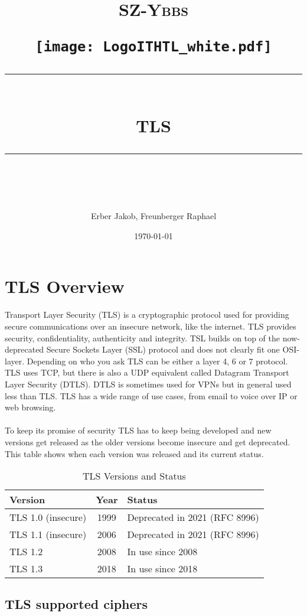 \documentclass[11pt]{scrartcl} %
\title{	
	\normalfont\normalsize
	\begin{center}
		\begin{minipage}[c]{0.2\textwidth}
			\textsc{\Large SZ-Ybbs}
		\end{minipage}%
		\begin{minipage}[c]{0.1\textwidth}
			\texttt{[image: LogoITHTL\_white.pdf]}
		\end{minipage}
	\end{center}
	\vspace{10pt} %
	\rule{\linewidth}{0.5pt}\\ %
	\vspace{20pt} %
	{\huge TLS}\\ %
	\vspace{12pt} %
	\rule{\linewidth}{2pt}\\ %
	\vspace{12pt} %
}
\author{\LARGE Erber Jakob, Freunberger Raphael} %
\date{\normalsize\today} %
\begin{document}
\maketitle %

\section{TLS Overview}

Transport Layer Security (TLS) is a cryptographic protocol used for providing secure communications over an insecure network, like the internet. TLS provides security, confidentiality, authenticity and integrity. TSL builds on top of the now-deprecated Secure Sockets Layer (SSL) protocol and does not clearly fit one OSI-layer. Depending on who you ask TLS can be either a layer 4, 6 or 7 protocol. TLS uses TCP, but there is also a UDP equivalent called Datagram Transport Layer Security (DTLS). DTLS is sometimes used for VPNs but in general used less than TLS. TLS has a wide range of use cases, from email to voice over IP or web browsing.
\\\\
To keep its promise of security TLS has to keep being developed and new versions get released as the older versions become insecure and get deprecated. This table shows when each version was released and its current status.

\begin{table}[h]
    \centering
    \begin{tabular}{|l|c|l|}
        \hline
        \textbf{Version} & \textbf{Year} & \textbf{Status} \\ \hline
        TLS 1.0 (insecure) & 1999 & Deprecated in 2021 (RFC 8996) \\ \hline
        TLS 1.1 (insecure) & 2006 & Deprecated in 2021 (RFC 8996) \\ \hline
        TLS 1.2 & 2008 & In use since 2008 \\ \hline
        TLS 1.3 & 2018 & In use since 2018 \\ \hline
    \end{tabular}
    \caption{TLS Versions and Status}
    \label{tab:tls_versions}
\end{table}

\subsection{TLS supported ciphers}
\label{sec:tls_supported_ciphers}
\end{document}
